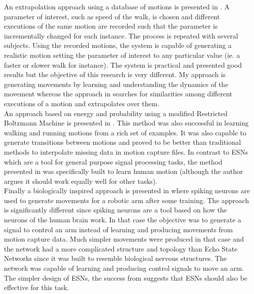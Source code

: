 \documentclass[letterpaper,9pt]{article}
\begin{document}
An extrapolation approach using a database of motions is presented in \cite{Gordon04StyleMotionSynthesis}. A parameter of interest, such as speed of the walk, is chosen and different executions of the same motion are recorded such that the parameter is incrementally changed for each instance. The process is repeated with several subjects. Using the recorded motions, the system is capable of generating a realistic motion setting the parameter of interest to any particular value (ie. a faster or slower walk for instance). The system is practical and presented good results but the objective of this research is very different. My approach is generating movements by learning and understanding the dynamics of the movement whereas the approach in \cite{Gordon04StyleMotionSynthesis} searches for similarities among different executions of a motion and extrapolates over them.  \\

An approach based on energy and probability using a modified Restricted Boltzmann Machine is presented in \cite{TaylorModelingHuman}. This method was also successful in learning walking and running motions from a rich set of examples. It was also capable to generate transitions between motions and proved to be better than traditional methods to interpolate missing data in motion capture files. In contrast to ESNs which are a tool for general purpose signal processing tasks, the method presented in \cite{TaylorModelingHuman} was specifically built to learn human motion (although the author argues it should work equally well for other tasks). \\

Finally a biologically inspired approach is presented in \cite{Joshi05MovementGeneration} where spiking neurons are used to generate movements for a robotic arm after some training. The approach is significantly different since spiking neurons are a tool based on how the neurons of the human brain work. In that case the objective was to generate a signal to control an arm instead of learning and producing movements from motion capture data. Much simpler movements were produced in that case and the network had a more complicated structure and topology than Echo State Networks since it was built to resemble biological nervous structures. The network was capable of learning and producing control signals to move an arm. The simpler design of ESNs, the success from \cite{GentHumanMotion} suggests that ESNs should also be effective for this task.\\
\end{document}

